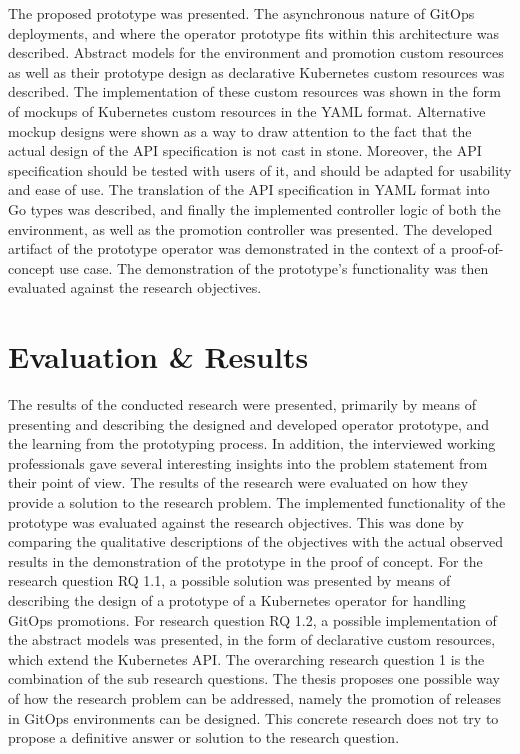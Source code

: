The proposed prototype was presented.
The asynchronous nature of GitOps deployments, and where
the operator prototype fits within this architecture was described.
Abstract models for the environment and promotion custom resources as well as their prototype
design as declarative Kubernetes custom resources was described.
The implementation of these custom resources was shown in the form of mockups
of Kubernetes custom resources in the YAML format.
Alternative mockup designs were shown as a way to draw attention to the fact
that the actual design of the API specification is not cast in stone.
Moreover, the API specification should be tested with users of it,
and should be adapted for usability and ease of use.
The translation of the API specification in YAML format into Go types was described,
and finally the implemented controller logic of both the environment, as well as
the promotion controller was presented.
The developed artifact of the prototype operator was
demonstrated in the context of a proof-of-concept use case.
The demonstration of the prototype's functionality was then evaluated against
the research objectives.

\section*{Evaluation \& Results}

The results of the conducted research were presented, primarily by means of
presenting and describing the designed and developed operator prototype, and the learning
from the prototyping process.
In addition, the interviewed working professionals gave several interesting insights into the problem
statement from their point of view.
The results of the research were evaluated on how they provide a solution to the research problem.
The implemented functionality of the prototype was evaluated against the research objectives.
This was done by comparing the qualitative descriptions of the objectives with the actual observed results
in the demonstration of the prototype in the proof of concept.
For the research question RQ 1.1,
a possible solution was presented by means of
describing the design of a prototype of a Kubernetes operator for handling GitOps promotions.
For research question RQ 1.2,
a possible implementation of the abstract models was presented, in the form of
declarative custom resources, which extend the Kubernetes API.
The overarching research question 1 is the combination of the sub research questions.
The thesis proposes one possible way of how the research problem can be addressed,
namely the promotion of releases in GitOps environments can be designed.
This concrete research does not try to propose a definitive answer or solution to the research question.

